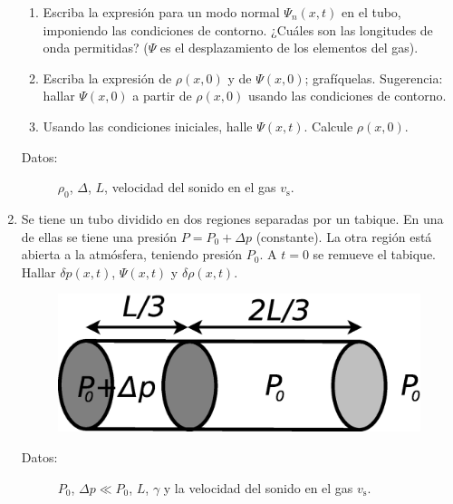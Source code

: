 \documentclass[11pt,spanish]{article}
\begin{document}
\begin{enumerate}
    \begin{enumerate}
        \item Escriba la expresión para un modo normal $\Psi_{n}(x,t)$ en el
        tubo, imponiendo las condiciones de contorno. ¿Cuáles son las longitudes
        de onda permitidas? ($\Psi$ es el desplazamiento de los elementos del
        gas). 

        \item Escriba la expresión de $\rho(x,0)$ y de $\Psi(x,0)$; grafíquelas.
        Sugerencia: hallar $\Psi(x,0)$ a partir de $\rho(x,0)$ usando las
        condiciones de contorno.

        \item Usando las condiciones iniciales, halle $\Psi(x,t)$. Calcule
        $\rho(x,0)$.
    \end{enumerate}

    \begin{description}
        \item [{Datos:}] $\rho_{0}$, $\Delta$, $L$, velocidad del sonido en el
        gas $v_\text{s}$.
    \end{description}


    \item Se tiene un tubo dividido en dos regiones separadas por un tabique.
    En una de ellas se tiene una presión $P=P_{0}+\Delta p$ (constante). La otra
    región está abierta a la atmósfera, teniendo presión $P_{0}$. A $t=0$ se
    remueve el tabique. Hallar $\delta p(x,t)$, $\Psi(x,t)$ y $\delta\rho(x,t)$.

    \begin{figure}[H]
        \centering{}\includegraphics[clip,scale=0.25]{figs/ej1-31}
    \end{figure}

    \begin{description}
        \item [{Datos:}] $P_{0}$, $\Delta p\ll P_{0}$, $L$, $\gamma$ y la
        velocidad del sonido en el gas $v_\text{s}$.
    \end{description}


\end{enumerate}
\end{document}

